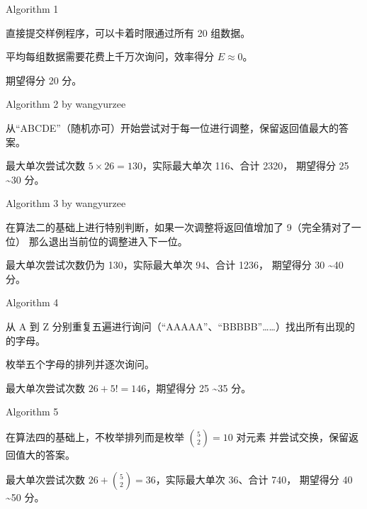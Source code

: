 \documentclass[UTF8]{beamer}
\begin{document}
\begin{frame}{Algorithm 1}

直接提交样例程序，可以卡着时限通过所有 20 组数据。

平均每组数据需要花费上千万次询问，效率得分 $E \approx 0$。\newline\newline

\pause 期望得分 20 分。

\end{frame}

\begin{frame}{Algorithm 2 by wangyurzee}

从“ABCDE”（随机亦可）开始尝试对于每一位进行调整，保留返回值最大的答案。\newline\newline

\pause 最大单次尝试次数 $5 \times 26 = 130$，实际最大单次 116、合计 2320，
期望得分 25 \textasciitilde 30 分。

\end{frame}

\begin{frame}{Algorithm 3 by wangyurzee}

在算法二的基础上进行特别判断，如果一次调整将返回值增加了 9（完全猜对了一位）%
那么退出当前位的调整进入下一位。\newline\newline

\pause 最大单次尝试次数仍为 130，实际最大单次 94、合计 1236，
期望得分 30 \textasciitilde 40 分。

\end{frame}

\begin{frame}{Algorithm 4}

从 A 到 Z 分别重复五遍进行询问（“AAAAA”、“BBBBB”……）找出所有出现的的字母。

枚举五个字母的排列并逐次询问。\newline\newline

\pause 最大单次尝试次数 $26 + 5! = 146$，期望得分 25 \textasciitilde 35 分。

\end{frame}

\begin{frame}{Algorithm 5}

在算法四的基础上，不枚举排列而是枚举 $\binom{5}{2} = 10$ 对元素%
并尝试交换，保留返回值大的答案。\newline\newline

\pause 最大单次尝试次数 $26 + \binom{5}{2} = 36$，实际最大单次 36、合计 740，
期望得分 40 \textasciitilde 50 分。

\end{frame}
\end{document}
